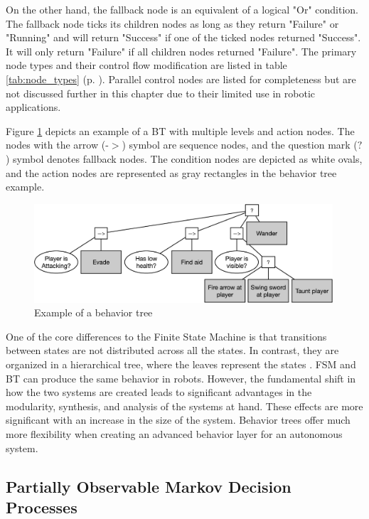 On the other hand, the fallback node is an equivalent of a logical "Or" condition. The fallback node ticks its children nodes as long as they return "Failure" or "Running" and will return "Success" if one of the ticked nodes returned "Success". It will only return "Failure" if all children nodes returned "Failure". The primary node types and their control flow modification are listed in table \ref{tab:node_types} (p. \pageref{tab:node_types}). Parallel control nodes are listed for completeness but are not discussed further in this chapter due to their limited use in robotic applications.

Figure \ref{fig:bt_example} depicts an example of a BT with multiple levels and action nodes. The nodes with the arrow (-$>$) symbol are sequence nodes, and the question mark ($?$) symbol denotes fallback nodes. The condition nodes are depicted as white ovals, and the action nodes are represented as gray rectangles in the behavior tree example.

\begin{figure}[ht]
	\centering
	\includegraphics[width=0.99\textwidth]{images/bt_example.jpg} 
	\caption{Example of a behavior tree \cite{iovino2022}}
	\label{fig:bt_example}
\end{figure}

One of the core differences to the Finite State Machine is that transitions between states are not distributed across all the states. In contrast, they are organized in a hierarchical tree, where the leaves represent the states \cite{iovino2022}. FSM and BT can produce the same behavior in robots. However, the fundamental shift in how the two systems are created leads to significant advantages in the modularity, synthesis, and analysis of the systems at hand. These effects are more significant with an increase in the size of the system. Behavior trees offer much more flexibility when creating an advanced behavior layer for an autonomous system. 


\subsection{Partially Observable Markov Decision Processes}

